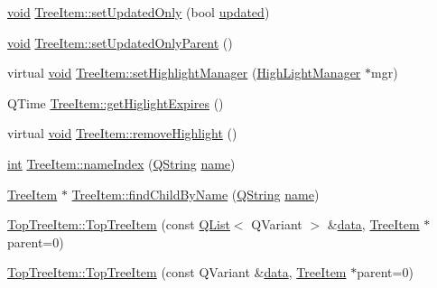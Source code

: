 \begin{DoxyCompactItemize}
\item 
\hyperlink{group___u_a_v_objects_plugin_ga444cf2ff3f0ecbe028adce838d373f5c}{void} \hyperlink{group___u_a_v_object_browser_plugin_ga63e16f896af89aa165dcd9c31d42ce83}{Tree\-Item\-::set\-Updated\-Only} (bool \hyperlink{_parse_e_k_f_log_8m_ae27e566dc7dcd1f77211f8374e4b017a}{updated})
\item 
\hyperlink{group___u_a_v_objects_plugin_ga444cf2ff3f0ecbe028adce838d373f5c}{void} \hyperlink{group___u_a_v_object_browser_plugin_gae74eb4785ae705b5a9ffc056a71fb88a}{Tree\-Item\-::set\-Updated\-Only\-Parent} ()
\item 
virtual \hyperlink{group___u_a_v_objects_plugin_ga444cf2ff3f0ecbe028adce838d373f5c}{void} \hyperlink{group___u_a_v_object_browser_plugin_gac523fe360648e1e148c4b30f6918c6be}{Tree\-Item\-::set\-Highlight\-Manager} (\hyperlink{class_high_light_manager}{High\-Light\-Manager} $\ast$mgr)
\item 
Q\-Time \hyperlink{group___u_a_v_object_browser_plugin_gabc3b5a703ec23600e388018db3349369}{Tree\-Item\-::get\-Higlight\-Expires} ()
\item 
virtual \hyperlink{group___u_a_v_objects_plugin_ga444cf2ff3f0ecbe028adce838d373f5c}{void} \hyperlink{group___u_a_v_object_browser_plugin_ga9620f3abc5fda75861a24032594766a6}{Tree\-Item\-::remove\-Highlight} ()
\item 
\hyperlink{ioapi_8h_a787fa3cf048117ba7123753c1e74fcd6}{int} \hyperlink{group___u_a_v_object_browser_plugin_gac2b731cbaed396ea1819b12ddb0f7767}{Tree\-Item\-::name\-Index} (\hyperlink{group___u_a_v_objects_plugin_gab9d252f49c333c94a72f97ce3105a32d}{Q\-String} \hyperlink{glext_8h_ad977737dfc9a274a62741b9500c49a32}{name})
\item 
\hyperlink{class_tree_item}{Tree\-Item} $\ast$ \hyperlink{group___u_a_v_object_browser_plugin_ga17e124da1542c7dab530add7dce6d170}{Tree\-Item\-::find\-Child\-By\-Name} (\hyperlink{group___u_a_v_objects_plugin_gab9d252f49c333c94a72f97ce3105a32d}{Q\-String} \hyperlink{glext_8h_ad977737dfc9a274a62741b9500c49a32}{name})
\item 
\hyperlink{group___u_a_v_object_browser_plugin_gaf9396b0e4b1f80d5d2eb271a4421aad9}{Top\-Tree\-Item\-::\-Top\-Tree\-Item} (const \hyperlink{class_q_list}{Q\-List}$<$ Q\-Variant $>$ \&\hyperlink{glext_8h_a8850df0785e6fbcc2351af3b686b8c7a}{data}, \hyperlink{class_tree_item}{Tree\-Item} $\ast$parent=0)
\item 
\hyperlink{group___u_a_v_object_browser_plugin_ga5c9d07784db08b50ef3905d2628f61e4}{Top\-Tree\-Item\-::\-Top\-Tree\-Item} (const Q\-Variant \&\hyperlink{glext_8h_a8850df0785e6fbcc2351af3b686b8c7a}{data}, \hyperlink{class_tree_item}{Tree\-Item} $\ast$parent=0)

\end{DoxyCompactItemize}
